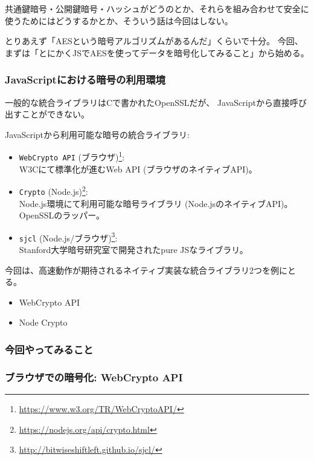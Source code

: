 \documentclass[12pt,dvipdfmx]{beamer}
\begin{document}
\begin{frame}
共通鍵暗号・公開鍵暗号・ハッシュがどうのとか、それらを組み合わせて安全に使うためにはどうするかとか、そういう話は今回はしない。

\vspace{1ex}

とりあえず「AESという暗号アルゴリズムがあるんだ」くらいで十分。
今回、まずは「\alert{とにかくJSでAESを使ってデータを暗号化してみること}」から始める。
\end{frame}


\begin{frame}
\frametitle{JavaScriptにおける暗号の利用環境}
\small
一般的な統合ライブラリはCで書かれたOpenSSLだが、
JavaScriptから直接呼び出すことができない。

\vspace{1ex}

JavaScriptから利用可能な暗号の統合ライブラリ:
\begin{itemize}
\item \alert{\texttt{WebCrypto API}} (ブラウザ)\footnote[frame]{\url{https://www.w3.org/TR/WebCryptoAPI/}}:\\
W3Cにて標準化が進むWeb API (ブラウザのネイティブAPI)。
\item \alert{\texttt{Crypto}} (Node.js)\footnote[frame]{\url{https://nodejs.org/api/crypto.html}}:\\
Node.js環境にて利用可能な暗号ライブラリ (Node.jsのネイティブAPI)。OpenSSLのラッパー。
\item \texttt{sjcl} (Node.js/ブラウザ)\footnote[frame]{\url{http://bitwiseshiftleft.github.io/sjcl/}}:\\
Stanford大学暗号研究室で開発されたpure JSなライブラリ。
\end{itemize}
\end{frame}

\begin{frame}
今回は、高速動作が期待されるネイティブ実装な統合ライブラリ2つを例にとる。
\begin{itemize}
 \item WebCrypto API
 \item Node Crypto
\end{itemize}
\end{frame}

\begin{frame}
\frametitle{今回やってみること}
\end{frame}

\begin{frame}
 \frametitle{ブラウザでの暗号化: WebCrypto API}
\end{frame}
\end{document}
